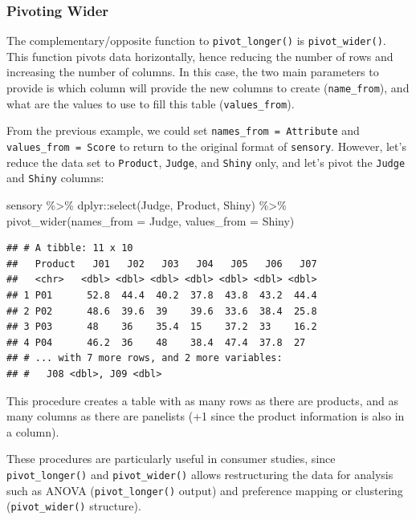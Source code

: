 \documentclass[
]{krantz}
\makeatletter
\newenvironment{Shaded}{\begin{snugshade}}{\end{snugshade}}
\newcommand{\AttributeTok}[1]{\textcolor[rgb]{0.61,0.61,0.61}{#1}}
\newcommand{\FunctionTok}[1]{\textcolor[rgb]{0,0,0}{#1}}
\newcommand{\NormalTok}[1]{#1}
\newcommand{\SpecialCharTok}[1]{\textcolor[rgb]{0,0,0}{#1}}
\newenvironment{kframe}{%
\medskip{}
\setlength{\fboxsep}{.8em}
 \def\at@end@of@kframe{}%
 \ifinner\ifhmode%
  \def\at@end@of@kframe{\end{minipage}}%
  \begin{minipage}{\columnwidth}%
 \fi\fi%
 \def\FrameCommand##1{\hskip\@totalleftmargin \hskip-\fboxsep
 \colorbox{shadecolor}{##1}\hskip-\fboxsep
     \hskip-\linewidth \hskip-\@totalleftmargin \hskip\columnwidth}%
 \MakeFramed {\advance\hsize-\width
   \@totalleftmargin\z@ \linewidth\hsize
   \@setminipage}}%
 {\par\unskip\endMakeFramed%
 \at@end@of@kframe}
\renewenvironment{Shaded}{\begin{kframe}}{\end{kframe}}
\makeatother
\begin{document}
\hypertarget{pivoting-wider}{%
\subsubsection*{Pivoting Wider}\label{pivoting-wider}}


The complementary/opposite function to \texttt{pivot\_longer()} is \texttt{pivot\_wider()}. This function pivots data horizontally, hence reducing the number of rows and increasing the number of columns. In this case, the two main parameters to provide is which column will provide the new columns to create (\texttt{name\_from}), and what are the values to use to fill this table (\texttt{values\_from}).

From the previous example, we could set \texttt{names\_from\ =\ Attribute} and \texttt{values\_from\ =\ Score} to return to the original format of \texttt{sensory}. However, let's reduce the data set to \texttt{Product}, \texttt{Judge}, and \texttt{Shiny} only, and let's pivot the \texttt{Judge} and \texttt{Shiny} columns:

\begin{Shaded}
\begin{Highlighting}[]
\NormalTok{sensory }\SpecialCharTok{\%\textgreater{}\%}
\NormalTok{  dplyr}\SpecialCharTok{::}\FunctionTok{select}\NormalTok{(Judge, Product, Shiny) }\SpecialCharTok{\%\textgreater{}\%}
  \FunctionTok{pivot\_wider}\NormalTok{(}\AttributeTok{names\_from =}\NormalTok{ Judge, }\AttributeTok{values\_from =}\NormalTok{ Shiny)}
\end{Highlighting}
\end{Shaded}

\begin{verbatim}
## # A tibble: 11 x 10
##   Product   J01   J02   J03   J04   J05   J06   J07
##   <chr>   <dbl> <dbl> <dbl> <dbl> <dbl> <dbl> <dbl>
## 1 P01      52.8  44.4  40.2  37.8  43.8  43.2  44.4
## 2 P02      48.6  39.6  39    39.6  33.6  38.4  25.8
## 3 P03      48    36    35.4  15    37.2  33    16.2
## 4 P04      46.2  36    48    38.4  47.4  37.8  27  
## # ... with 7 more rows, and 2 more variables:
## #   J08 <dbl>, J09 <dbl>
\end{verbatim}

This procedure creates a table with as many rows as there are products, and as many columns as there are panelists (+1 since the product information is also in a column).

These procedures are particularly useful in consumer studies, since \texttt{pivot\_longer()} and \texttt{pivot\_wider()} allows restructuring the data for analysis such as ANOVA (\texttt{pivot\_longer()} output) and preference mapping or clustering (\texttt{pivot\_wider()} structure).
\end{document}
